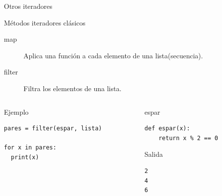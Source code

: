 \documentclass[bigger,unknownkeysallowed]{beamer}
\begin{document}
\begin{frame}[fragile,label={sec:org9784394}]{Otros iteradores}
 \begin{block}{Métodos iteradores clásicos}
\begin{description}
\item[{map}] Aplica una función a cada elemento de una lista(secuencia).

\item[{filter}] Filtra los elementos de una lista.
\end{description}
\end{block}

\begin{columns}[t]
\begin{column}{0.5\columnwidth}
\begin{exampleblock}{Ejemplo}
\begin{verbatim}
pares = filter(espar, lista)

for x in pares:
  print(x)
\end{verbatim}
\end{exampleblock}
\end{column}
\begin{column}{0.5\columnwidth}
\begin{exampleblock}{espar}
\begin{verbatim}
def espar(x):
    return x % 2 == 0
\end{verbatim}
\scriptsize
\end{exampleblock}

\begin{block}{Salida}
\scriptsize
\begin{verbatim}
2
4
6
\end{verbatim}
\end{block}
\end{column}
\end{columns}
\end{frame}
\end{document}
